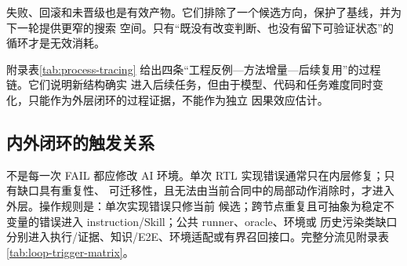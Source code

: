 \documentclass[UTF8,a4paper,zihao=-4,oneside]{ctexart}
\begin{document}
失败、回滚和未晋级也是有效产物。它们排除了一个候选方向，保护了基线，并为下一轮提供更窄的搜索
空间。只有“既没有改变判断、也没有留下可验证状态”的循环才是无效消耗。

附录表\ref{tab:process-tracing} 给出四条“工程反例---方法增量---后续复用”的过程链。它们说明新结构确实
进入后续任务，但由于模型、代码和任务难度同时变化，只能作为外层闭环的过程证据，不能作为独立
因果效应估计。

\newcommand{\TableProcessTracing}{%
\begin{table}[H]
  \centering
  \small
  \caption{工程反例、方法增量与后续复用的过程追踪}
  \label{tab:process-tracing}
  \begin{tabularx}{\linewidth}{@{}L{0.19\linewidth}L{0.27\linewidth}L{0.27\linewidth}Y@{}}
    \toprule
    暴露的失败模式 & 外层闭环固化的机制 & 后续复用场景 & 可观察结果及边界 \\
    \midrule
    lint 无法回答镜像能否运行 & 动态 image/pmem/DPI/trace/exit 图节点 & RV32 single 与 SoC 动态执行 & 从语法推进到给定镜像；不等于完整 ISA \\
    target/reference 与配置易串证 & 场景 profile、分层实验身份和任务合同 & RV64 自测、40/40 DiffTest 与 CoreMark 对拍 & 能区分自测和对拍；无 prompt-only 对照 \\
    完整系统日志被旧 oracle 误判 & 原始状态/版本化 replay 分离，长跑提交失败关闭 & Ubuntu A3 replay、HUP/TERM 与 early-exit 自测 & 保留 source FAIL 并形成限定重放；未测节省时数 \\
    owner 量测曾身份非法、B 延迟敏感性已识别，PPA 时序硬门失败 & 量测合同、守恒式、受控干预、Selector 与 PPA 资格全序 & PERF\_BASELINE、owner A/B、敏感性实验与下一动作选择 & H1 只获分析授权，不授权 production RTL 或晋级；PPA 保持 UNQUALIFIED \\
    \bottomrule
  \end{tabularx}
\end{table}
}%

\subsection{内外闭环的触发关系}

不是每一次 FAIL 都应修改 AI 环境。单次 RTL 实现错误通常只在内层修复；只有缺口具有重复性、
可迁移性，且无法由当前合同中的局部动作消除时，才进入外层。操作规则是：单次实现错误只修当前
候选；跨节点重复且可抽象为稳定不变量的错误进入 instruction/Skill；公共 runner、oracle、环境或
历史污染类缺口分别进入执行/证据、知识/E2E、环境适配或有界召回接口。完整分流见附录表
\ref{tab:loop-trigger-matrix}。
\end{document}
